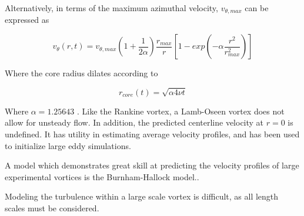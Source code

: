 \noindent
Alternatively, in terms of the maximum azimuthal velocity, $v_{\theta, max}$  
can be expressed as

\begin{equation}
v_{\theta}(r,t) = v_{\theta, max} (1 + \frac{1}{2 \alpha}) \frac{r_{max}}{r} 
[1 - exp(- \alpha \frac{r^2}{r_{max}^2})]
\label{eq:lamb3}
\end{equation}

\noindent
Where the core radius dilates according to 

\begin{equation}
r_{core}(t) = \sqrt{\alpha 4 \nu t}
\label{eq:lamb4}
\end{equation}

\noindent
Where $\alpha = 1.25643$ \cite{davenport1996}. Like the Rankine vortex, a 
Lamb-Oseen vortex does not allow for unsteady flow. In addition, the predicted 
centerline velocity at $r=0$ is undefined. It has utility in estimating average 
velocity profiles, and has been used to initialize large eddy simulations.

A model which demonstrates great skill at predicting the velocity profiles of 
large experimental vortices is the Burnham-Hallock model.\cite{burnam2013}.

Modeling the turbulence within a large scale vortex 
is difficult, as all length scales must be considered.